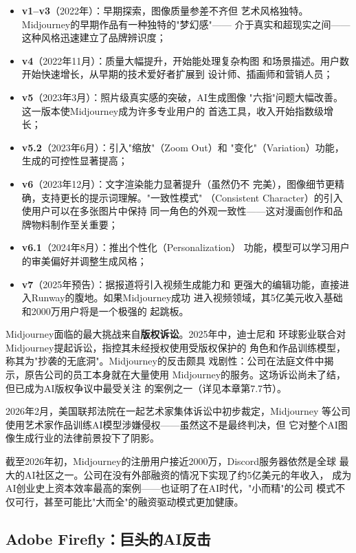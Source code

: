 \begin{itemize}
  \item \textbf{v1--v3}（2022年）：早期探索，图像质量参差不齐但
    艺术风格独特。Midjourney的早期作品有一种独特的"梦幻感"——
    介于真实和超现实之间——这种风格迅速建立了品牌辨识度；
  \item \textbf{v4}（2022年11月）：质量大幅提升，开始能处理复杂构图
    和场景描述。用户数开始快速增长，从早期的技术爱好者扩展到
    设计师、插画师和营销人员；
  \item \textbf{v5}（2023年3月）：照片级真实感的突破，AI生成图像
    "六指"问题大幅改善。这一版本使Midjourney成为许多专业用户的
    首选工具，收入开始指数级增长；
  \item \textbf{v5.2}（2023年6月）：引入"缩放"（Zoom Out）和
    "变化"（Variation）功能，生成的可控性显著提高；
  \item \textbf{v6}（2023年12月）：文字渲染能力显著提升（虽然仍不
    完美），图像细节更精确，支持更长的提示词理解。"一致性模式"
    （Consistent Character）的引入使用户可以在多张图片中保持
    同一角色的外观一致性——这对漫画创作和品牌物料制作至关重要；
  \item \textbf{v6.1}（2024年8月）：推出个性化（Personalization）
    功能，模型可以学习用户的审美偏好并调整生成风格；
  \item \textbf{v7}（2025年预告）：据报道将引入视频生成能力和
    更强大的编辑功能，直接进入Runway的腹地。如果Midjourney成功
    进入视频领域，其5亿美元收入基础和2000万用户将是一个极强的
    起跳板。
\end{itemize}

Midjourney面临的最大挑战来自\textbf{版权诉讼}。2025年中，迪士尼和
环球影业联合对Midjourney提起诉讼，指控其未经授权使用受版权保护的
角色和作品训练模型，称其为"抄袭的无底洞"。Midjourney的反击颇具
戏剧性：公司在法庭文件中揭示，原告公司的员工本身就在大量使用
Midjourney的服务。这场诉讼尚未了结，但已成为AI版权争议中最受关注
的案例之一（详见本章第7.7节）。

2026年2月，美国联邦法院在一起艺术家集体诉讼中初步裁定，Midjourney
等公司使用艺术家作品训练AI模型涉嫌侵权——虽然这不是最终判决，但
它对整个AI图像生成行业的法律前景投下了阴影。

截至2026年初，Midjourney的注册用户接近2000万，Discord服务器依然是全球
最大的AI社区之一。公司在没有外部融资的情况下实现了约5亿美元的年收入，
成为AI创业史上资本效率最高的案例——也证明了在AI时代，"小而精"的公司
模式不仅可行，甚至可能比"大而全"的融资驱动模式更加健康。

\subsection{Adobe Firefly：巨头的AI反击}
\label{subsec:adobe-firefly}

